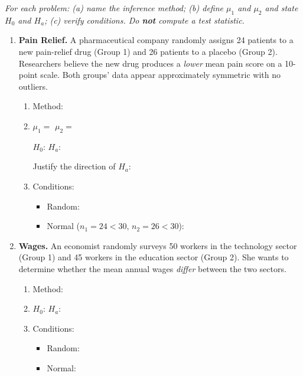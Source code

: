\documentclass[10pt]{article}
\begin{document}
\namedateperiod

\vspace{0.12in}

\textit{For each problem: (a) name the inference method; (b) define $\mu_1$ and $\mu_2$ and
state $H_0$ and $H_a$; (c) verify conditions. Do \textbf{not} compute a test statistic.}

\begin{enumerate}

\item \textbf{Pain Relief.} \quad
A pharmaceutical company randomly assigns 24 patients to a new pain-relief drug (Group 1)
and 26 patients to a placebo (Group 2). Researchers believe the new drug produces a
\emph{lower} mean pain score on a 10-point scale. Both groups' data appear approximately
symmetric with no outliers.

\begin{enumerate}[label=\alph*.]
  \item Method: \blank{5.5cm}
  \item $\mu_1 = $ \blank{5.5cm} \quad $\mu_2 = $ \blank{5.5cm}

        $H_0$: \blank{4.5cm} \quad $H_a$: \blank{4.5cm}

        Justify the direction of $H_a$: \writeline
  \item Conditions:
        \begin{itemize}
          \item Random: \writeline
          \item Normal ($n_1 = 24 < 30$, $n_2 = 26 < 30$): \writeline
        \end{itemize}
\end{enumerate}
\vspace{0.08in}

\item \textbf{Wages.} \quad
An economist randomly surveys 50 workers in the technology sector (Group 1) and 45 workers
in the education sector (Group 2). She wants to determine whether the mean annual wages
\emph{differ} between the two sectors.

\begin{enumerate}[label=\alph*.]
  \item Method: \blank{5.5cm}
  \item $H_0$: \blank{4.5cm} \quad $H_a$: \blank{4.5cm}
  \item Conditions:
        \begin{itemize}
          \item Random: \writeline
          \item Normal: \writeline
        \end{itemize}
\end{enumerate}
\vspace{0.08in}


\end{enumerate}
\end{document}
